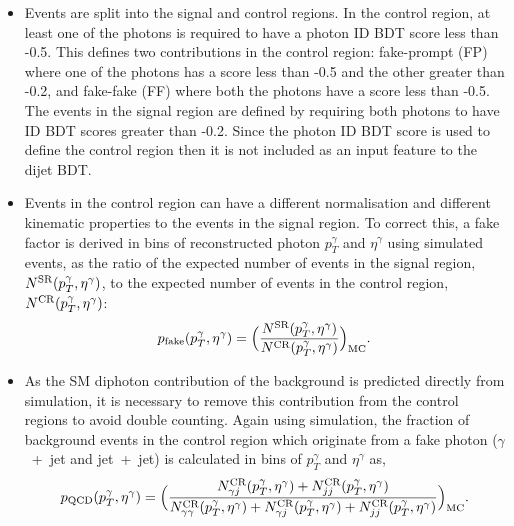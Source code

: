 \begin{itemize}
    \item Events are split into the signal and control regions. In the control region, at least one of the photons is required to have a photon ID BDT score less than -0.5. This defines two contributions in the control region: fake-prompt (FP) where one of the photons has a score less than -0.5 and the other greater than -0.2, and fake-fake (FF) where both the photons have a score less than -0.5. The events in the signal region are defined by requiring both photons to have ID BDT scores greater than -0.2. Since the photon ID BDT score is used to define the control region then it is not included as an input feature to the dijet BDT.
    
    \item Events in the control region can have a different normalisation and different kinematic properties to the events in the signal region. To correct this, a fake factor is derived in bins of reconstructed photon $p_T^\gamma$ and $\eta^\gamma$ using simulated events, as the ratio of the expected number of events in the signal region, $N^{\rm{SR}}(p_T^\gamma,\eta^\gamma)$, to the expected number of events in the control region, $N^{\rm{CR}}(p_T^\gamma,\eta^\gamma)$:
    \begin{equation}
        p_{\rm{fake}}(p_T^\gamma,\eta^\gamma) = \Big(\frac{N^{\rm{SR}}(p_T^\gamma,\eta^\gamma)}{N^{\rm{CR}}(p_T^\gamma,\eta^\gamma)}\Big)_{\rm{MC}}.
    \end{equation}
    
    \item As the SM diphoton contribution of the background is predicted directly from simulation, it is necessary to remove this contribution from the control regions to avoid double counting. Again using simulation, the fraction of background events in the control region which originate from a fake photon ($\gamma$~+~jet and jet~+~jet) is calculated in bins of $p_T^{\gamma}$ and $\eta^\gamma$ as,
    \begin{equation}
        p_{\rm{QCD}}(p_T^\gamma,\eta^\gamma) = \Big(\frac{N_{\gamma j}^{\rm{CR}}(p_T^\gamma,\eta^\gamma)+N_{jj}^{\rm{CR}}(p_T^\gamma,\eta^\gamma)}{N_{\gamma\gamma}^{\rm{CR}}(p_T^\gamma,\eta^\gamma)+N_{\gamma j}^{\rm{CR}}(p_T^\gamma,\eta^\gamma)+N_{jj}^{\rm{CR}}(p_T^\gamma,\eta^\gamma)}\Big)_{\rm{MC}}.
    \end{equation}    
    

\end{itemize}
